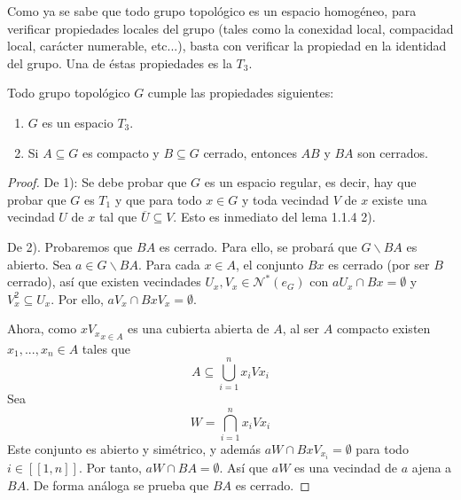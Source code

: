 \documentclass[12pt]{report}
\theoremstyle{largebreak}
\newcommand{\Ns}[1]{\ensuremath{\mathscr{N}^*(#1)}}
\newcommand{\natint}[1]{\ensuremath{[\!\left[#1\right]\!]}}
\begin{document}
    Como ya se sabe que todo grupo topológico es un espacio homogéneo, para verificar propiedades locales del grupo (tales como la conexidad local, compacidad local, carácter numerable, etc...), basta con verificar la propiedad en la identidad del grupo. Una de éstas propiedades es la $T_3$.

    \begin{lema}
        Todo grupo topológico $G$ cumple las propiedades siguientes:
        \begin{enumerate}
            \item $G$ es un espacio $T_3$.
            \item Si $A\subseteq G$ es compacto y $B\subseteq G$ cerrado, entonces $AB$ y $BA$ son cerrados.
        \end{enumerate}
    \end{lema}

    \begin{proof}
        De 1): Se debe probar que $G$ es un espacio regular, es decir, hay que probar que $G$ es $T_1$ y que para todo $x\in G$ y toda vecindad $V$ de $x$ existe una vecindad $U$ de $x$ tal que $\overline{U}\subseteq V$. Esto es inmediato del lema 1.1.4 2).

        De 2). Probaremos que $BA$ es cerrado. Para ello, se probará que $G\backslash BA$ es abierto. Sea $a\in G\backslash BA$. Para cada $x\in A$, el conjunto $Bx$ es cerrado (por ser $B$ cerrado), así que existen vecindades $U_x,V_x\in\Ns{e_G}$ con $aU_x\cap Bx=\emptyset$ y $V_x^2\subseteq U_x$. Por ello, $aV_x\cap BxV_x=\emptyset$.

        Ahora, como ${xV_x}_{x\in A}$ es una cubierta abierta de $A$, al ser $A$ compacto existen $x_1,...,x_n\in A$ tales que
        \begin{equation*}
            A\subseteq\bigcup_{i=1}^n x_iV{x_i}
        \end{equation*}
        Sea
        \begin{equation*}
            W=\bigcap_{i=1}^n x_iV{x_i}
        \end{equation*}
        Este conjunto es abierto y simétrico, y además $aW\cap BxV_{x_i}=\emptyset$ para todo $i\in\natint{1,n}$. Por tanto, $aW\cap BA=\emptyset$. Así que $aW$ es una vecindad de $a$ ajena a $BA$. De forma análoga se prueba que $BA$ es cerrado.
    \end{proof}
\end{document}
